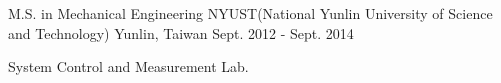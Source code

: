 

\begin{cventries}

  \cventry
    {M.S. in Mechanical Engineering} %
    {NYUST(National Yunlin University of Science and Technology)} %
    {Yunlin, Taiwan} %
    {Sept. 2012 - Sept. 2014} %
    {
      \begin{cvitems} %
        \item {System Control and Measurement Lab.}
      \end{cvitems}
    }

\end{cventries}
